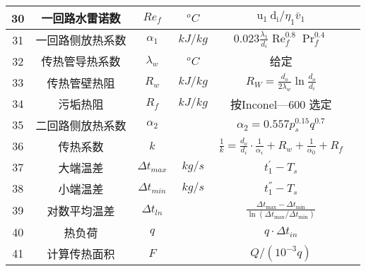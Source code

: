 \begin{table}[H]
{\begin{tabular}{|c|c|c|c|c|c|}
            30   & 一回路水雷诺数   & $ Re_f $            & $ ^oC $   & $ \mathrm{u}_{1} \mathrm{~d}_{\mathrm{i}} / \eta_{1} \bar{v}_{1} $                                 &      \\ \hline
            31   & 一回路侧放热系数 & $ \alpha_1 $        & $ kJ/kg $ & $ 0.023 \frac{\lambda_{1}}{d_{i}} \operatorname{Re}_{f}^{0.8} \operatorname{Pr}_{f}^{0.4} $        &      \\ \hline
            32   & 传热管导热系数   & $ \lambda_w $       & $ ^oC $   & 给定                                                                                               &      \\ \hline
            33   & 传热管壁热阻     & $ R_w $             & $ kJ/kg $ & $ R_{W}=\frac{d_{o}}{2 \lambda_{w}} \ln \frac{d_{o}}{d_{i}} $                                      &      \\ \hline
            34   & 污垢热阻         & $ R_f $             & $ kJ/kg $ & 按Inconel—600 选定                                                                                 &      \\ \hline
            35   & 二回路侧放热系数 & $ \alpha_2 $        &           & $ \alpha_{2}=0.557 p_{s}^{0.15} q^{0.7} $                                                          &      \\ \hline
            36   & 传热系数         & $ k $               &           & $ \frac{1}{k}=\frac{d_{o}}{d_{i}} \cdot \frac{1}{\alpha_{i}}+R_{w}+\frac{1}{\alpha_{0}}+R_{f} $    &      \\ \hline
            37   & 大端温差         & $ \Delta t_{max} $  & $ kg/s $  & $ t_{1}^{'} - T_s $                                                                                &      \\ \hline
            38   & 小端温差         & $ \Delta t_{min} $  & $ kg/s $  & $ t_{1}^{''} - T_s $                                                                               &      \\ \hline
            39   & 对数平均温差     & $ \Delta t_{ln} $   &           & $ \frac{\Delta t_{\max }-\Delta t_{\min }}{\ln \left(\Delta t_{\max } / \Delta t_{\min }\right)} $ &      \\ \hline
            40   & 热负荷           & $ q $               &           & $ q \cdot \Delta t_{in}$                                                                           &      \\ \hline
            41   & 计算传热面积     & $ F $               &           & $ Q/(10^{-3}q) $                                                                                   &      \\ \hline

\end{tabular}}
\end{table}

